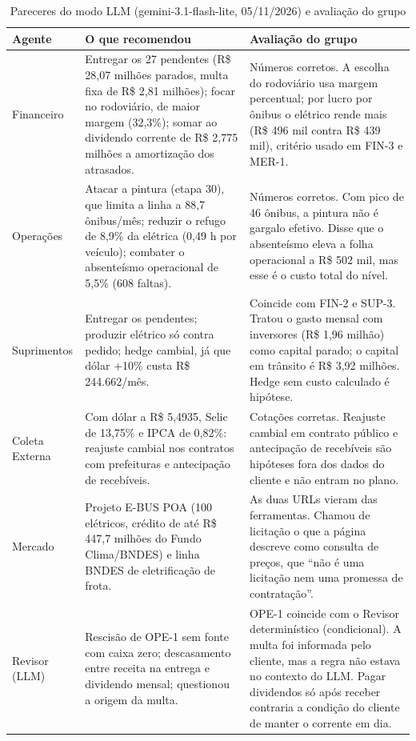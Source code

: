 \documentclass[12pt,a4paper,oneside,brazil]{abntex2}
\begin{document}
\begin{table}[htb]
\caption{Pareceres do modo LLM (gemini-3.1-flash-lite, 05/11/2026) e avaliação do grupo}
\label{tab:llm}
\centering\scriptsize
\begin{tabular}{@{}p{}p{}p{}@{}}
\toprule
\textbf{Agente} & \textbf{O que recomendou} & \textbf{Avaliação do grupo} \\
\midrule
Financeiro & Entregar os 27 pendentes (R\$ 28,07 milhões parados, multa fixa de R\$ 2,81 milhões); focar no rodoviário, de maior margem (32,3\%); somar ao dividendo corrente de R\$ 2,775 milhões a amortização dos atrasados. & Números corretos. A escolha do rodoviário usa margem percentual; por lucro por ônibus o elétrico rende mais (R\$ 496 mil contra R\$ 439 mil), critério usado em FIN-3 e MER-1. \\
\addlinespace
Operações & Atacar a pintura (etapa 30), que limita a linha a 88,7 ônibus/mês; reduzir o refugo de 8,9\% da elétrica (0,49 h por veículo); combater o absenteísmo operacional de 5,5\% (608 faltas). & Números corretos. Com pico de 46 ônibus, a pintura não é gargalo efetivo. Disse que o absenteísmo eleva a folha operacional a R\$ 502 mil, mas esse é o custo total do nível. \\
\addlinespace
Suprimentos & Entregar os pendentes; produzir elétrico só contra pedido; hedge cambial, já que dólar +10\% custa R\$ 244.662/mês. & Coincide com FIN-2 e SUP-3. Tratou o gasto mensal com inversores (R\$ 1,96 milhão) como capital parado; o capital em trânsito é R\$ 3,92 milhões. Hedge sem custo calculado é hipótese. \\
\addlinespace
Coleta Externa & Com dólar a R\$ 5,4935, Selic de 13,75\% e IPCA de 0,82\%: reajuste cambial nos contratos com prefeituras e antecipação de recebíveis. & Cotações corretas. Reajuste cambial em contrato público e antecipação de recebíveis são hipóteses fora dos dados do cliente e não entram no plano. \\
\addlinespace
Mercado & Projeto E-BUS POA (100 elétricos, crédito de até R\$ 447,7 milhões do Fundo Clima/BNDES) e linha BNDES de eletrificação de frota. & As duas URLs vieram das ferramentas. Chamou de licitação o que a página descreve como consulta de preços, que ``não é uma licitação nem uma promessa de contratação''. \\
\addlinespace
Revisor (LLM) & Rescisão de OPE-1 sem fonte com caixa zero; descasamento entre receita na entrega e dividendo mensal; questionou a origem da multa. & OPE-1 coincide com o Revisor determinístico (condicional). A multa foi informada pelo cliente, mas a regra não estava no contexto do LLM. Pagar dividendos só após receber contraria a condição do cliente de manter o corrente em dia. \\
\bottomrule
\end{tabular}
\end{table}
\end{document}

